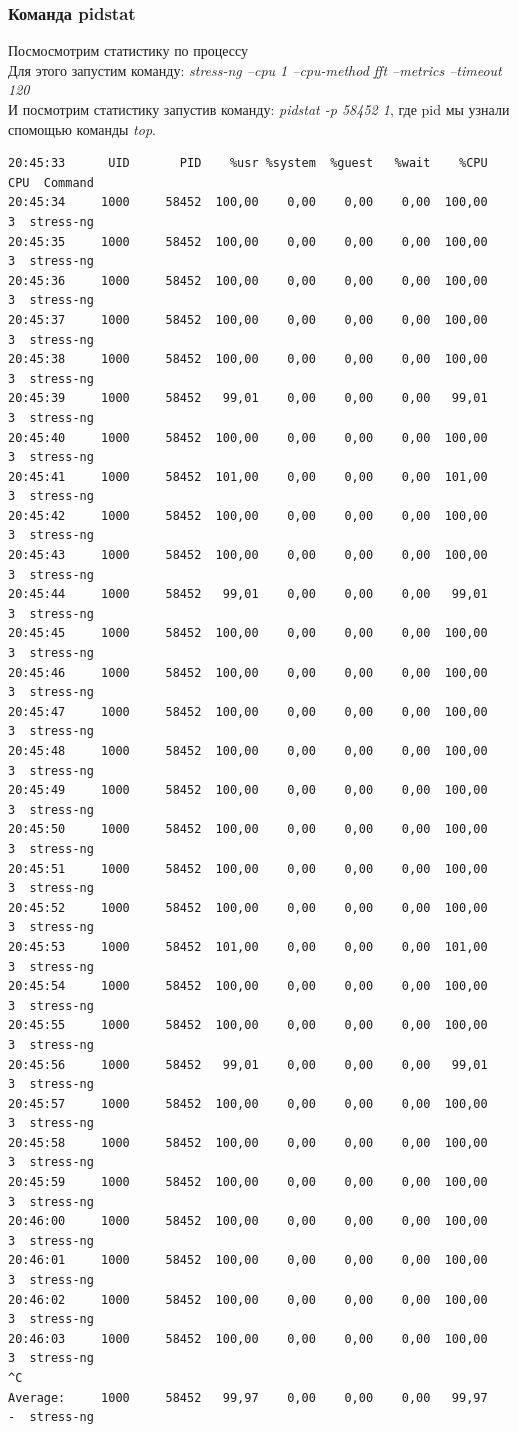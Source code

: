 \documentclass[12pt,onecolumn]{article}
\begin{document}
\subsubsection{Команда pidstat}
Посмосмотрим статистику по процессу\\
Для этого запустим команду: \textit{stress-ng --cpu 1 --cpu-method fft --metrics --timeout 120}\\
И посмотрим статистику запустив команду: \textit{pidstat -p 58452 1}, где pid мы узнали спомощью команды \textit{top}.
\begin{verbatim}
20:45:33      UID       PID    %usr %system  %guest   %wait    %CPU   CPU  Command
20:45:34     1000     58452  100,00    0,00    0,00    0,00  100,00     3  stress-ng
20:45:35     1000     58452  100,00    0,00    0,00    0,00  100,00     3  stress-ng
20:45:36     1000     58452  100,00    0,00    0,00    0,00  100,00     3  stress-ng
20:45:37     1000     58452  100,00    0,00    0,00    0,00  100,00     3  stress-ng
20:45:38     1000     58452  100,00    0,00    0,00    0,00  100,00     3  stress-ng
20:45:39     1000     58452   99,01    0,00    0,00    0,00   99,01     3  stress-ng
20:45:40     1000     58452  100,00    0,00    0,00    0,00  100,00     3  stress-ng
20:45:41     1000     58452  101,00    0,00    0,00    0,00  101,00     3  stress-ng
20:45:42     1000     58452  100,00    0,00    0,00    0,00  100,00     3  stress-ng
20:45:43     1000     58452  100,00    0,00    0,00    0,00  100,00     3  stress-ng
20:45:44     1000     58452   99,01    0,00    0,00    0,00   99,01     3  stress-ng
20:45:45     1000     58452  100,00    0,00    0,00    0,00  100,00     3  stress-ng
20:45:46     1000     58452  100,00    0,00    0,00    0,00  100,00     3  stress-ng
20:45:47     1000     58452  100,00    0,00    0,00    0,00  100,00     3  stress-ng
20:45:48     1000     58452  100,00    0,00    0,00    0,00  100,00     3  stress-ng
20:45:49     1000     58452  100,00    0,00    0,00    0,00  100,00     3  stress-ng
20:45:50     1000     58452  100,00    0,00    0,00    0,00  100,00     3  stress-ng
20:45:51     1000     58452  100,00    0,00    0,00    0,00  100,00     3  stress-ng
20:45:52     1000     58452  100,00    0,00    0,00    0,00  100,00     3  stress-ng
20:45:53     1000     58452  101,00    0,00    0,00    0,00  101,00     3  stress-ng
20:45:54     1000     58452  100,00    0,00    0,00    0,00  100,00     3  stress-ng
20:45:55     1000     58452  100,00    0,00    0,00    0,00  100,00     3  stress-ng
20:45:56     1000     58452   99,01    0,00    0,00    0,00   99,01     3  stress-ng
20:45:57     1000     58452  100,00    0,00    0,00    0,00  100,00     3  stress-ng
20:45:58     1000     58452  100,00    0,00    0,00    0,00  100,00     3  stress-ng
20:45:59     1000     58452  100,00    0,00    0,00    0,00  100,00     3  stress-ng
20:46:00     1000     58452  100,00    0,00    0,00    0,00  100,00     3  stress-ng
20:46:01     1000     58452  100,00    0,00    0,00    0,00  100,00     3  stress-ng
20:46:02     1000     58452  100,00    0,00    0,00    0,00  100,00     3  stress-ng
20:46:03     1000     58452  100,00    0,00    0,00    0,00  100,00     3  stress-ng
^C
Average:     1000     58452   99,97    0,00    0,00    0,00   99,97     -  stress-ng
\end{verbatim}
\end{document}
